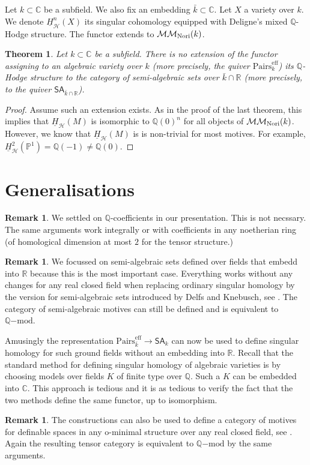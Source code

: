 \documentclass[11pt,a4paper]{amsart}
\newtheorem{thm}[lemma]{Theorem}
\theoremstyle{definition}
\newtheorem{rem}[lemma]{Remark}
\newcommand{\MMN}{\mathcal{MM}_{\rm Nori}}
\newcommand{\eff}{\mathrm{eff}}
\newcommand{\Qmod}{\Q\mathrm{-mod}}
\newcommand{\hodge}{\ul{H}_{\mathcal{H}}}
\newcommand{\pairs}{\mathrm{Pairs}}
\newcommand{\SA}{\mathsf{SA}}
\newcommand{\pairseff}{\pairs^\eff}
\newcommand{\Q}{\mathbb{Q}}
\newcommand{\R}{\mathbb{R}}
\newcommand{\C}{\mathbb{C}}
\newcommand{\Pe}{\mathbb{P}} %
\newcommand{\ul}[1]{\underline{#1}}
\begin{document}
Let $k\subset\C$ be a subfield. We also fix an embedding
$\bar{k}\subset\C$. Let $X$ a variety over $k$. We denote $\hodge^n(X)$ its singular cohomology equipped with Deligne's mixed $\Q$-Hodge structure. The functor extends to $\MMN(k)$.

\begin{thm} Let $k\subset\C$ be a subfield. There is no extension of
the functor assigning to an algebraic variety over $k$ (more precisely, the quiver $\pairseff_k$) its $\Q$-Hodge structure to the category of semi-algebraic sets
over $\bar{k}\cap\R$ (more precisely, to the quiver $\SA_{\bar{k}\cap\R}$).
\end{thm}
\begin{proof}Assume such an extension exists.
As in the proof of the last theorem, this implies that $\hodge(M)$ is isomorphic to $\Q(0)^n$ for all objects of $\MMN(k)$. However, we know that $\hodge(M)$ is is non-trivial for most motives. For example,
$\hodge^2(\Pe^1)=\Q(-1)\neq\Q(0)$.
\end{proof}


\section{Generalisations}\label{sec:generalisations}
\begin{rem} We settled on $\Q$-coefficients in our presentation. This is not necssary. The same arguments work integrally or with coefficients in  any noetherian ring (of homological dimension at most $2$ for the tensor structure.)
\end{rem}
\begin{rem}
We focussed on semi-algebraic sets defined over fields that embedd into
$\R$ because this is the most important case. 
Everything works without any changes for any real closed field when replacing ordinary singular homology by the version for semi-algebraic sets introduced by
Delfs and Knebusch, see \cite{DK-homology}.
The
category of semi-algebraic motives can still be defined and is equivalent to
$\Qmod$.

 Amusingly the representation $\pairseff_{\bar{k}}\to\SA_k$ can now be used to define singular homology for such ground fields without an embedding into $\R$. 
Recall that the standard method for defining singular homology of algebraic varieties is by choosing models over fields $K$ of finite type over $\Q$. Such a $K$ can be embedded into $\C$. This approach is tedious and it is as tedious to verify the fact that the two methods define the same functor, up to isomorphism.
\end{rem}
\begin{rem}
The constructions can also be used to define a category of motives
for definable spaces in any o-minimal structure over any real closed field,
 see \cite{D:oMin}.
Again the resulting tensor category is equivalent to $\Qmod$ by the same arguments.
\end{rem}
\end{document}
